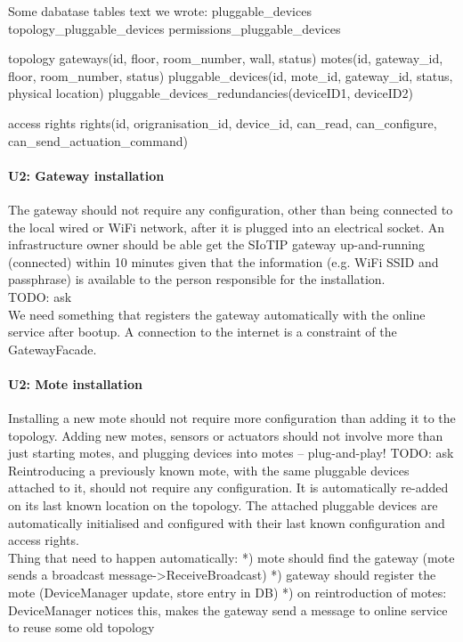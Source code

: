     Some dabatase tables text we wrote:
        pluggable\_devices
        topology\_pluggable\_devices
        permissions\_pluggable\_devices

        topology
            gateways(id, floor, room\_number, wall, status)
            motes(id, gateway\_id, floor, room\_number, status)
            pluggable\_devices(id, mote\_id, gateway\_id, status, physical location)
            pluggable\_devices\_redundancies(deviceID1, deviceID2)

        access rights
            rights(id, origranisation\_id, device\_id, can\_read, can\_configure, can\_send\_actuation\_command)

    \paragraph{U2: Gateway installation}
        The gateway should not require any configuration, other than being connected
        to the local wired or WiFi network, after it is plugged into an electrical
        socket. An infrastructure owner should be able get the SIoTIP gateway
        up-and-running (connected) within 10 minutes given that the information
        (e.g. WiFi SSID and passphrase) is available to the person responsible for
        the installation. \\
        TODO: ask \\
        We need something that registers the gateway automatically with the
        online service after bootup. A connection to the internet is a constraint
        of the GatewayFacade.


    \paragraph{U2: Mote installation}
        Installing a new mote should not require more configuration than adding it
        to the topology. Adding new motes, sensors or actuators should not involve
        more than just starting motes, and plugging devices into motes – plug-and-play! TODO: ask \\
        Reintroducing a previously known mote, with the same pluggable devices attached to it,
        should not require any configuration. It is automatically re-added on
        its last known location on the topology. The attached pluggable devices
        are automatically initialised and configured with their last known
        configuration and access rights. \\
        Thing that need to happen automatically:
        *) mote should find the gateway (mote sends a broadcast message->ReceiveBroadcast)
        *) gateway should register the mote (DeviceManager update, store entry in DB)
        *) on reintroduction of motes: DeviceManager notices this, makes the gateway send a message to online service to reuse some old topology

